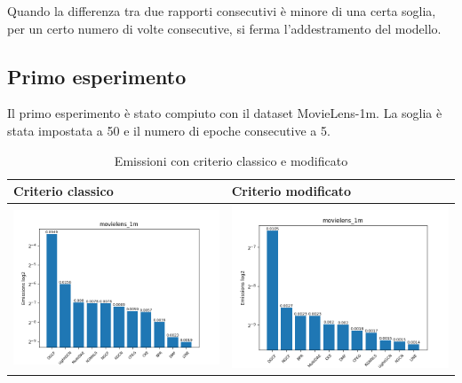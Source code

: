 \noindent Quando la differenza tra due rapporti consecutivi è minore di una certa soglia, per un certo numero di volte consecutive, si ferma l'addestramento del modello.

\subsection{Primo esperimento}

Il primo esperimento è stato compiuto con il dataset MovieLens-1m. La soglia è stata impostata a 50 e il numero di epoche consecutive a 5.

\begin{table}[H]
    \centering
    \footnotesize
    \setlength\tabcolsep{0pt}
    \begin{tabularx}{\textwidth}{|X|X|}
        \hline
        \textbf{Criterio classico} & \textbf{Criterio modificato} \\
        \hline
        \includegraphics[width=\linewidth, trim=0 0 0 0]{images/emissions_movielens_1m_earlyClassic.png} &
        \includegraphics[width=\linewidth, trim=0 0 0 0]{images/emissions_movielens_1m_earlyModified.png} \\
        \hline
    \end{tabularx}
    \caption{Emissioni con criterio classico e modificato}
    \label{tab:emissions_info}
\end{table}

